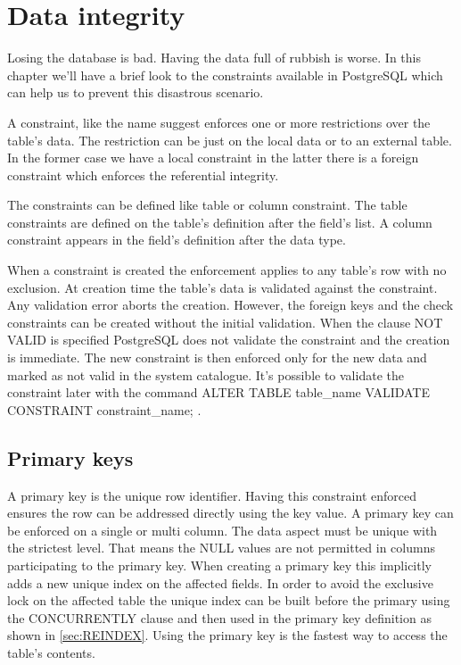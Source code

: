 \chapter{Data integrity}
\label{cha:DATAINT}
Losing the database is bad. Having the data full of rubbish is worse. In this chapter we'll have a
brief look to the constraints available in PostgreSQL which can help us to prevent this
disastrous scenario.\newline

A constraint, like the name suggest enforces one or more restrictions over the
table's data. The restriction can be just on the local data or to an external table. In the former
case we have a local constraint in the latter there is a foreign constraint which enforces the
referential integrity.\newline

The constraints can be defined like table or column constraint. The table constraints are defined on
the table's definition after the field's list. A column constraint appears in the field's
definition after the data type.\newline

When a constraint is created the enforcement applies to any table's row with no exclusion. At
creation time the table's data is validated against the constraint. Any validation error aborts
the creation. However, the foreign keys and the check constraints can be created without the initial
validation. When the clause NOT VALID is specified PostgreSQL does not
validate the constraint and the creation is immediate. The new constraint is then enforced only for
the new data and marked as not valid in the system catalogue. It's possible to validate the
constraint later with the command ALTER TABLE table\_name VALIDATE CONSTRAINT
constraint\_name; .

\section{Primary keys} 
A primary key is the unique row identifier. Having this constraint enforced ensures the row can be 
addressed directly using the key value. A primary key can be enforced on a single or multi column. 
The data aspect must be unique with the strictest level. That means the NULL values are not 
permitted in columns participating to the primary key. When creating a primary key this 
implicitly adds a new unique index on the affected fields. In order to avoid the exclusive lock 
on the affected  table the unique index can be built before the primary using the CONCURRENTLY 
clause and then used in the primary key definition as shown in \ref{sec:REINDEX}. Using the primary 
key is the fastest way to access the table's contents.\newline

